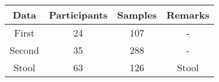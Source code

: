 \begin{tabular}{c|ccc}
    Data & Participants & Samples & Remarks \\ \hline
    First & 24 & 107 & - \\
    Second & 35 & 288 & - \\
    Stool & 63 & 126 & Stool \\
\end{tabular}
